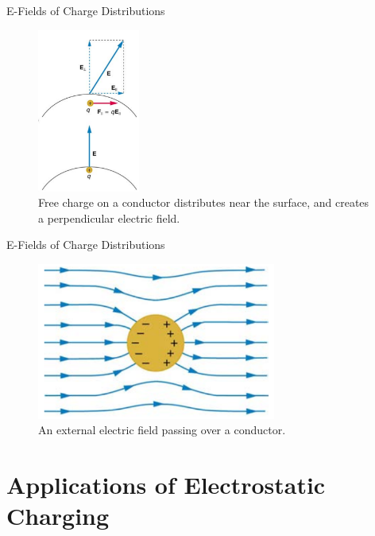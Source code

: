 \documentclass{beamer}
\begin{document}
\begin{frame}{E-Fields of Charge Distributions}
\begin{figure}
\centering
\includegraphics[width=0.3\textwidth]{figures/perp.png}
\caption{\label{fig:perp1} Free charge on a conductor distributes near the surface, and creates a perpendicular electric field.}
\end{figure}
\end{frame}

\begin{frame}{E-Fields of Charge Distributions}
\begin{figure}
\centering
\includegraphics[width=0.7\textwidth]{figures/perp2.png}
\caption{\label{fig:perp2} An external electric field passing over a conductor.}
\end{figure}
\end{frame}

\section{Applications of Electrostatic Charging}
\end{document}
